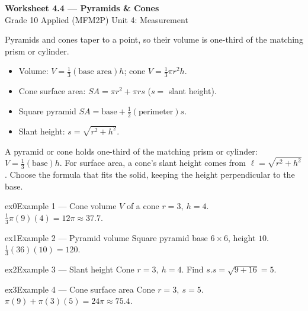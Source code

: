 \documentclass[11pt]{article}
\begin{document}
\begin{center}
{\LARGE\bfseries\color{titleblue}Worksheet 4.4 --- Pyramids \& Cones}\\[2pt]
{\small Grade 10 Applied (MFM2P) \textperiodcentered{} Unit 4: Measurement}
\end{center}

\begin{ideabox}
Pyramids and cones taper to a point, so their volume is one-third of the matching prism or cylinder.
\begin{itemize}[leftmargin=*,itemsep=2pt]
  \item Volume: $V=\tfrac13(\text{base area})h$; cone $V=\tfrac13\pi r^2h$.
  \item Cone surface area: $SA=\pi r^2+\pi r s$ ($s=$ slant height).
  \item Square pyramid $SA=\text{base}+\tfrac12(\text{perimeter})s$.
  \item Slant height: $s=\sqrt{r^2+h^2}$.
\end{itemize}
\end{ideabox}

\begin{learnbox}
A pyramid or cone holds one-third of the matching prism or cylinder: $V=\tfrac13(\text{base})h$.
For surface area, a cone's slant height comes from $\ell=\sqrt{r^2+h^2}$.
Choose the formula that fits the solid, keeping the height perpendicular to the base.
\end{learnbox}


\begin{example}{ex0}{Example 1 --- Cone volume}
$V$ of a cone $r=3,\ h=4$.\soln $\tfrac13\pi(9)(4)=12\pi\approx37.7$.
\end{example}

\begin{example}{ex1}{Example 2 --- Pyramid volume}
Square pyramid base $6\times6$, height $10$.\soln $\tfrac13(36)(10)=120$.
\end{example}

\begin{example}{ex2}{Example 3 --- Slant height}
Cone $r=3,\ h=4$. Find $s$.\soln $s=\sqrt{9+16}=5$.
\end{example}

\begin{example}{ex3}{Example 4 --- Cone surface area}
Cone $r=3,\ s=5$.\soln $\pi(9)+\pi(3)(5)=24\pi\approx75.4$.
\end{example}
\end{document}
